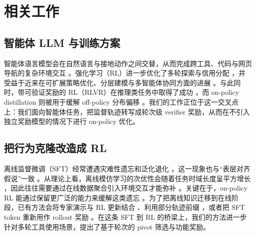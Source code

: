 \section{相关工作}
\label{sec:related}

\subsection{智能体 LLM 与训练方案}
智能体语言模型会在自然语言与接地动作之间交替，从而完成跨工具、代码与网页导航的复杂环境交互 \citep{yao2023react,schick2023toolformer,xu2023toolbench,qin2023toolllm,shridhar2020alfworld,wang2022scienceworld,jimenez2024swebench,wang2025openhandsopenplatformai,pan2025trainingsoftwareengineeringagents,yao2022webshop,wei2025browsecompsimplechallengingbenchmark,ma2024agentboard,wang2024sotopiapi}。强化学习（RL）进一步优化了多轮探索与信用分配 \citep{ouyang2022training,schulman2017ppo,schulman2015trpo,wang2025sparl,song2024trialerror,zhang2025rlvmr}，并受益于近来在可扩展策略优化、分层建模与多智能体协同方面的进展 \citep{ji2025treesearchllmrl,rohatgi2025tamingprocessverifiers,xue2025simpletir,dong2025toolstar,yang2025dcpo,yu2025dapoopensourcellmreinforcement,luo2025agentlightningtrainai,dong2025agenticreinforcedpolicyoptimization,su2025toolorchestra,zhou2024archer,prabhakar2025apigenmtagenticpipelinemultiturn,zhou2025sweetrl,xi2025agentgymrl}。与此同时，带可验证奖励的 RL（RLVR）在推理类任务中取得了成功 \citep{shao2024deepseekmath,xin2024deepseekproverv15harnessingproofassistant,Guo_2025,5team2025glm45agenticreasoningcoding}，而 on-policy distillation 则被用于缓解 off-policy 分布偏移 \citep{lu2025onpolicydistillation,zhao2026selfdistilledreasoneronpolicyselfdistillation,xu2025learninginteractionagenticdistillation,hubotter2026selfdistillation}。我们的工作正位于这一交叉点上：我们面向智能体任务，把监督轨迹转写成轮次级 verifier 奖励，从而在不引入独立奖励模型的情况下进行 on-policy 优化。

\subsection{把行为克隆改造成 RL}
离线监督微调（SFT）经常遭遇灾难性遗忘和泛化退化 \citep{luo2023empiricalCF,li2024revisitingCF,imanov2026mechanisticCF,kirkpatrick2017ewc,li2016lwf}，这一现象也与“表层对齐假说”一致 \citep{zhou2023limaalignment,vergarabrowne2026sahcomplexity,raghavendra2024revisitingSAH}。从理论上看，离线模仿学习的次优性会随着任务时域长度呈平方增长 \citep{rajaraman2020towardfundamentallimitsimitation}，因此往往需要通过在线数据聚合引入环境交互才能弥补 \citep{ross2011dagger,swamy2022minimaxoptimalonlineimitation}。关键在于，on-policy RL 能通过保留更广泛的能力来缓解这类遗忘 \citep{shenfeld2025rlsrazoronlinereinforcement,chen2025retainingdoingroleonpolicy}。为了把离线知识迁移到在线阶段，已有方法会将专家演示与 RL 更新结合 \citep{uchendu2022jumpstartreinforcementlearning,hester2018dqfd}、利用部分轨迹前缀 \citep{setlur2026prefixrl}，或者把 SFT token 重新用作 rollout 奖励 \citep{ming2025onetokenrollout}。在这条 SFT 到 RL 的桥梁上，我们的方法进一步针对多轮工具使用场景，提出了基于轮次的 pivot 筛选与功能奖励。
